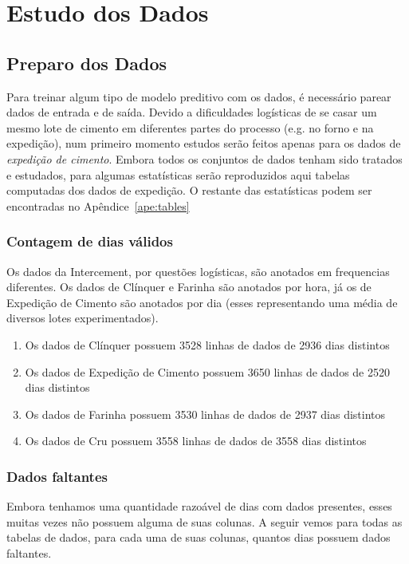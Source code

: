 \chapter{Estudo dos Dados}
\label{cap:estudodados}


\section{Preparo dos Dados}


Para treinar algum tipo de modelo preditivo com os dados, é necessário parear
dados de entrada e de saída. Devido a dificuldades logísticas de se casar um
mesmo lote de cimento em diferentes partes do processo (e.g. no forno e na
expedição), num primeiro momento estudos serão feitos apenas para os dados de
\textit{expedição de cimento}. Embora todos os conjuntos de dados tenham sido
tratados e estudados, para algumas estatísticas serão reproduzidos aqui tabelas computadas dos
dados de expedição. O restante das estatísticas podem ser encontradas no Apêndice~\ref{ape:tables}

\subsection{Contagem de dias válidos}

Os dados da Intercement, por questões logísticas, são anotados em frequencias
diferentes. Os dados de Clínquer e Farinha são anotados por hora, já os de
Expedição de Cimento são anotados por dia (esses representando uma média de
diversos lotes experimentados).

\begin{enumerate}
    \item Os dados de  Clínquer possuem 3528 linhas de dados de 2936 dias distintos
\item Os dados de  Expedição de Cimento possuem 3650 linhas de dados de 2520 dias distintos
\item Os dados de  Farinha possuem 3530 linhas de dados de 2937 dias distintos
\item Os dados de  Cru possuem 3558 linhas de dados de 3558 dias distintos
\end{enumerate}

\subsection{Dados faltantes}
Embora tenhamos uma quantidade razoável de dias com dados presentes, esses muitas vezes não possuem alguma de suas colunas.
A seguir vemos para todas as tabelas de dados, para cada uma de suas colunas, quantos
dias possuem dados faltantes. 

